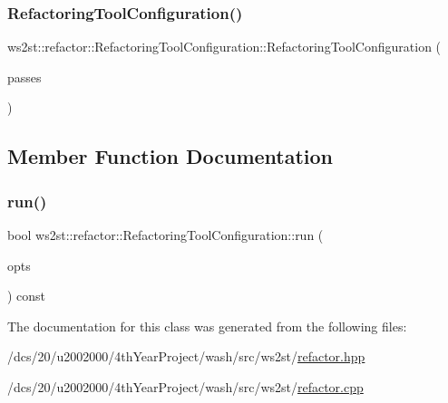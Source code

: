 \subsubsection{\texorpdfstring{Refactoring\+Tool\+Configuration()}{RefactoringToolConfiguration()}}
{\footnotesize\ttfamily ws2st\+::refactor\+::\+Refactoring\+Tool\+Configuration\+::\+Refactoring\+Tool\+Configuration (\begin{DoxyParamCaption}\item[{std\+::initializer\+\_\+list$<$ \mbox{\hyperlink{classws2st_1_1refactor_1_1RefactorPass}{Refactor\+Pass}} $>$}]{passes }\end{DoxyParamCaption})\hspace{0.3cm}{\ttfamily [inline]}}



\subsection{Member Function Documentation}
\mbox{\label{classws2st_1_1refactor_1_1RefactoringToolConfiguration_a7ff018cf2d0f2ec54274efcfa00df72f}} 
\subsubsection{\texorpdfstring{run()}{run()}}
{\footnotesize\ttfamily bool ws2st\+::refactor\+::\+Refactoring\+Tool\+Configuration\+::run (\begin{DoxyParamCaption}\item[{const \mbox{\hyperlink{structWashOptions}{Wash\+Options}} \&}]{opts }\end{DoxyParamCaption}) const}



The documentation for this class was generated from the following files\+:\begin{DoxyCompactItemize}
\item 
/dcs/20/u2002000/4th\+Year\+Project/wash/src/ws2st/\mbox{\hyperlink{refactor_8hpp}{refactor.\+hpp}}\item 
/dcs/20/u2002000/4th\+Year\+Project/wash/src/ws2st/\mbox{\hyperlink{refactor_8cpp}{refactor.\+cpp}}\end{DoxyCompactItemize}
